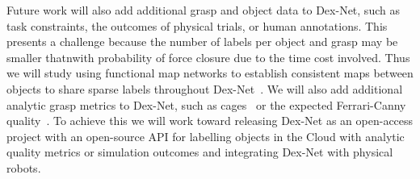 Future work will also add additional grasp and object data to Dex-Net, such as task constraints, the outcomes of physical trials, or human annotations.
This presents a challenge because the number of labels per object and grasp may be smaller thatnwith probability of force closure due to the time cost involved.
Thus we will study using functional map networks to establish consistent maps between objects to share sparse labels throughout Dex-Net~\cite{huang2013fine}.
We will also add additional analytic grasp metrics to Dex-Net, such as cages~\cite{diankov2010automated} or the expected Ferrari-Canny quality~\cite{kim2012physically}.
To achieve this we will work toward releasing Dex-Net as an open-access project with an open-source API for labelling objects in the Cloud with analytic quality metrics or simulation outcomes and integrating Dex-Net with physical robots.

